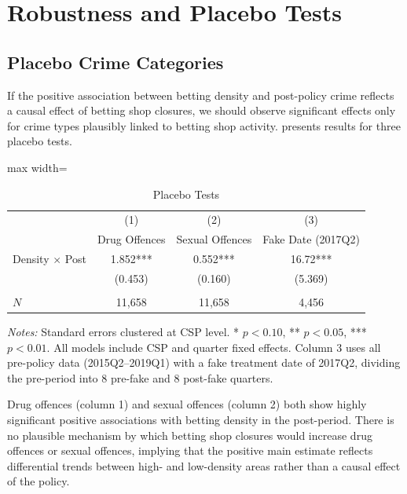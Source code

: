 \documentclass[12pt]{article}
\begin{document}
\section{Robustness and Placebo Tests}
\label{sec:robustness}

\subsection{Placebo Crime Categories}

If the positive association between betting density and post-policy crime reflects a causal effect of betting shop closures, we should observe significant effects only for crime types plausibly linked to betting shop activity.  presents results for three placebo tests.

\begin{table}[H]
\centering
\caption{Placebo Tests}
\label{tab:placebo}
\begin{adjustbox}{max width=\textwidth}
\begin{threeparttable}
\begin{tabular}{lccc}
\toprule
& (1) & (2) & (3) \\
& Drug Offences & Sexual Offences & Fake Date (2017Q2) \\
\midrule
Density $\times$ Post & 1.852*** & 0.552*** & 16.72*** \\
& (0.453) & (0.160) & (5.369) \\
\\
$N$ & 11,658 & 11,658 & 4,456 \\
\bottomrule
\end{tabular}
\begin{tablenotes}[flushleft]
\small
\item \textit{Notes:} Standard errors clustered at CSP level. * $p<0.10$, ** $p<0.05$, *** $p<0.01$. All models include CSP and quarter fixed effects. Column 3 uses all pre-policy data (2015Q2--2019Q1) with a fake treatment date of 2017Q2, dividing the pre-period into 8 pre-fake and 8 post-fake quarters.
\end{tablenotes}
\end{threeparttable}
\end{adjustbox}
\end{table}

Drug offences (column 1) and sexual offences (column 2) both show highly significant positive associations with betting density in the post-period. There is no plausible mechanism by which betting shop closures would increase drug offences or sexual offences, implying that the positive main estimate reflects differential trends between high- and low-density areas rather than a causal effect of the policy.
\end{document}
